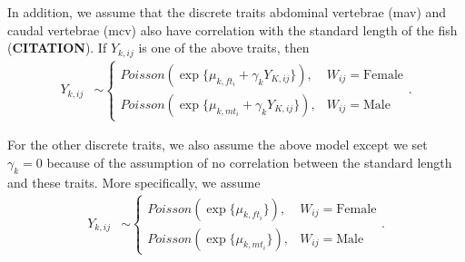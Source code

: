 \documentclass[
  12pt,
]{article}
\begin{document}
In addition, we assume that the discrete traits abdominal vertebrae
(mav) and caudal vertebrae (mcv) also have correlation with the standard
length of the fish (\textbf{CITATION}). If \(Y_{k,ij}\) is one of the
above traits, then \begin{align}
{Y}_{k,ij} & \sim \left\{\begin{array}{ll} Poisson(\exp\{\mu_{k,ft_i} + \gamma_kY_{K,ij}\}), & W_{ij} = \text{Female} \\ Poisson(\exp\{\mu_{k,mt_i} + \gamma_kY_{K,ij}\}), & W_{ij} = \text{Male} \end{array}\right..
\label{eq:disc_corr}
\end{align}

For the other discrete traits, we also assume the above model except we
set \(\gamma_k = 0\) because of the assumption of no correlation between
the standard length and these traits. More specifically, we assume
\begin{align}
{Y}_{k,ij} & \sim \left\{\begin{array}{ll} Poisson(\exp\{\mu_{k,ft_i}\}), & W_{ij} = \text{Female} \\ Poisson(\exp\{\mu_{k,mt_i}\}), & W_{ij} = \text{Male} \end{array}\right..
\label{eq:disc_ind}
\end{align}
\end{document}
